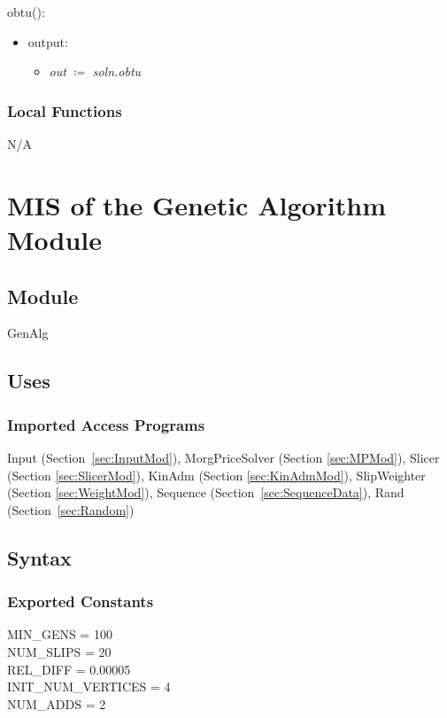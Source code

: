 \documentclass[12pt, titlepage]{article}
\begin{document}
\noindent obtu():
\begin{itemize}
	\item output:
	\begin{itemize}
		\item[] \textit{out} $\coloneqq$ \textit{soln.obtu}\\
	\end{itemize}
\end{itemize}

\subsubsection{Local Functions}

N/A


\section{MIS of the Genetic Algorithm Module} \label{sec:GenAlgMod}

\subsection{Module}
GenAlg

\subsection{Uses}

\subsubsection{Imported Access Programs}
Input (Section~\ref{sec:InputMod}), MorgPriceSolver (Section \ref{sec:MPMod}), 
Slicer (Section \ref{sec:SlicerMod}), KinAdm (Section \ref{sec:KinAdmMod}), 
SlipWeighter (Section \ref{sec:WeightMod}), Sequence 
(Section~\ref{sec:SequenceData}), Rand (Section~\ref{sec:Random})

\subsection{Syntax}

\subsubsection{Exported Constants}
MIN\_GENS = 100\\
NUM\_SLIPS = 20\\
REL\_DIFF = 0.00005\\
INIT\_NUM\_VERTICES = 4\\
NUM\_ADDS = 2\\
\end{document}
